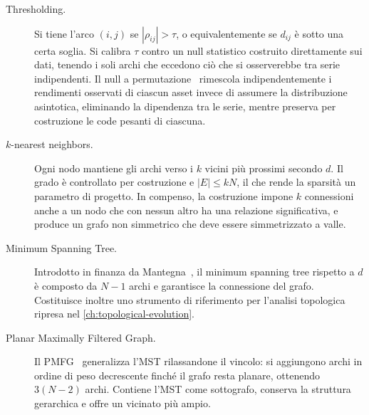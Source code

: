 \begin{description}
    \item[Thresholding.] Si tiene l'arco $(i,j)$ se $|\rho_{ij}|>\tau$, o equivalentemente se $d_{ij}$ è sotto una certa soglia. Si calibra $\tau$ contro un null statistico costruito direttamente sui dati, tenendo i soli archi che eccedono ciò che si osserverebbe tra serie indipendenti. Il null a permutazione~\cite{good2005permutation} rimescola indipendentemente i rendimenti osservati di ciascun asset invece di assumere la distribuzione asintotica, eliminando la dipendenza tra le serie, mentre preserva per costruzione le code pesanti di ciascuna.
    \item[$k$-nearest neighbors.] Ogni nodo mantiene gli archi verso i $k$ vicini più prossimi secondo $d$. Il grado è controllato per costruzione e $|E|\leq kN$, il che rende la sparsità un parametro di progetto. In compenso, la costruzione impone $k$ connessioni anche a un nodo che con nessun altro ha una relazione significativa, e produce un grafo non simmetrico che deve essere simmetrizzato a valle.
    \item[Minimum Spanning Tree.] Introdotto in finanza da Mantegna~\cite{mantegna1999hierarchical}, il minimum spanning tree rispetto a $d$ è composto da $N-1$ archi e garantisce la connessione del grafo. Costituisce inoltre uno strumento di riferimento per l'analisi topologica ripresa nel \cref{ch:topological-evolution}.
    \item[Planar Maximally Filtered Graph.] Il PMFG~\cite{tumminello2005tool} generalizza l'MST rilassandone il vincolo: si aggiungono archi in ordine di peso decrescente finché il grafo resta planare, ottenendo $3(N-2)$ archi. Contiene l'MST come sottografo, conserva la struttura gerarchica e offre un vicinato più ampio.
\end{description}

